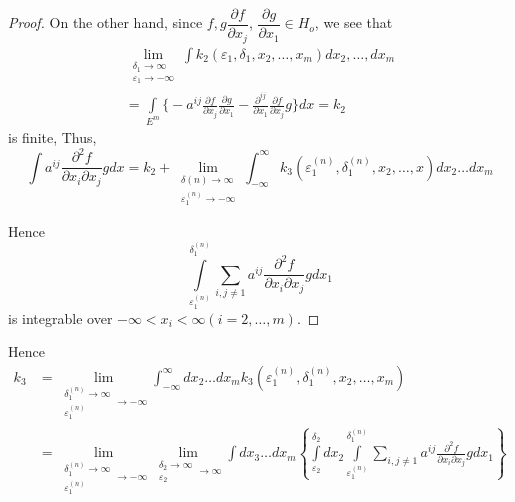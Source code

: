 \begin{proof}
 On the other hand, since $f, g \dfrac{\partial f}{\partial x_j}$,
 $\dfrac{\partial g}{\partial x_1} \in H_o$, we see that 
 \begin{gather*}
  \lim\limits_{\substack{\delta_1 \to \infty\\ \varepsilon_1 \to - \infty}}
  \int k_2 (\varepsilon_1, \delta_1, x_2, \ldots, x_m) d x_2,
  \ldots, dx_m \\ 
  = \int\limits_{ E^m} \big\{ - a^{ij} \frac{\partial f }{\partial
   x_j} \frac{\partial 
   g }{\partial x_1} - \frac{\partial^{ij}}{\partial x_1}
  \frac{\partial f }{\partial x_j} g \big\} d x = k_2 
 \end{gather*}
 is finite, Thus, 
 $$
 \int a^{ij} \frac{\partial^2 f}{\partial x_i \partial x_j} g d x =
 k_2 + \lim\limits_{\substack{\delta(n) \to \infty \\ \varepsilon
  ^{(n)}_1 \to-\infty}} \int^{\infty}_{- \infty} k_3
 (\varepsilon^{(n)}_1, \delta^{(n)}_{1}, x_2, \ldots, x ) dx_2
 \ldots dx_m 
 $$
 
 Hence   
 $$
 \int\limits^{ \delta_1^{(n)}}_{ \varepsilon^{(n)}_1} \sum_{ i, j \neq
  1} a^{ij} \frac{\partial^2 f }{\partial x_i \partial x_j} g dx_1 
 $$
 is integrable over $-\infty < x_i < \infty (i = 2, \ldots, m)$. 
\end{proof}

Hence 
\begin{align*}
 k_3 & = \lim\limits_{\substack{\delta^{(n)}_1 \to \infty
   \\ \varepsilon^{(n)}_1 } \to -\infty} \int^{\infty}_{- \infty}
 dx_2 \ldots dx_m k_3 (\varepsilon^{(n)}_1, \delta^{(n)}_1, x_2,
 \ldots, x_m)\\ 
& = \lim\limits_{\substack{ \delta^{(n)}_1 \to \infty
   \\ \varepsilon^{(n)}_1 } \to -\infty}  \lim\limits_{\substack{
   \delta_{2} \to \infty \\ \varepsilon_{2} } \to \infty} \int dx_3
 \ldots dx_m
 \left\{ \int\limits^{ \delta_2}_{ \varepsilon_2} dx_2
 \int\limits^{ \delta^{(n)}_1}_{ \varepsilon^{(n)}_1} \sum_{ i, j
  \neq 1} a^{ij} \frac{\partial^2 f}{\partial x_i \partial x_j} g
 dx_1 \right\}
\end{align*}

